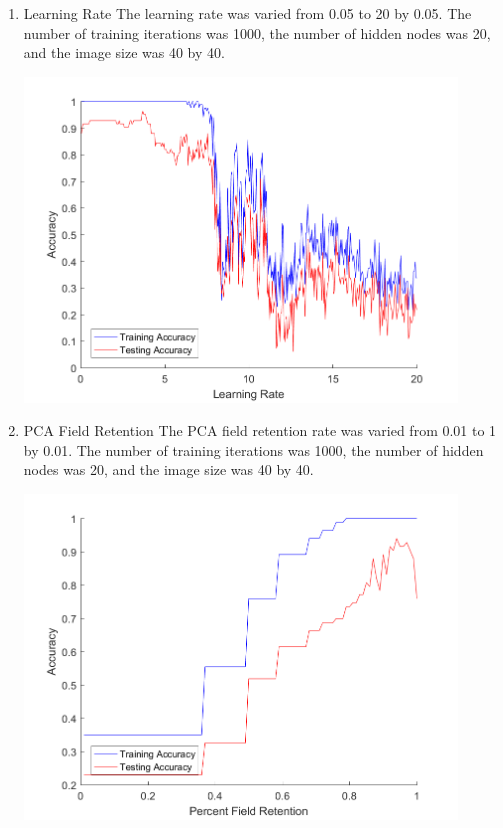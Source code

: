 \documentclass[12pt]{article}
\begin{document}
\begin{enumerate}
\begin{center}
    \label{fig:img_size}
  \end{center}
  \item Learning Rate
  The learning rate was varied from 0.05 to 20 by 0.05. The number of training iterations was 1000, the number of hidden nodes was 20, and the image size was 40 by 40.
  \begin{center}
    \includegraphics[width=115mm]{./accuracy_imgs/learning_rate_empirical.png}
    \label{fig:img_size}
  \end{center}
  \item PCA Field Retention
  The PCA field retention rate was varied from 0.01 to 1 by 0.01. The number of training iterations was 1000, the number of hidden nodes was 20, and the image size was 40 by 40.
  \begin{center}
    \includegraphics[width=115mm]{./accuracy_imgs/percent_field_retention_empirical.png}
    \label{fig:img_size}
  \end{center}
\end{enumerate}
\end{document}
